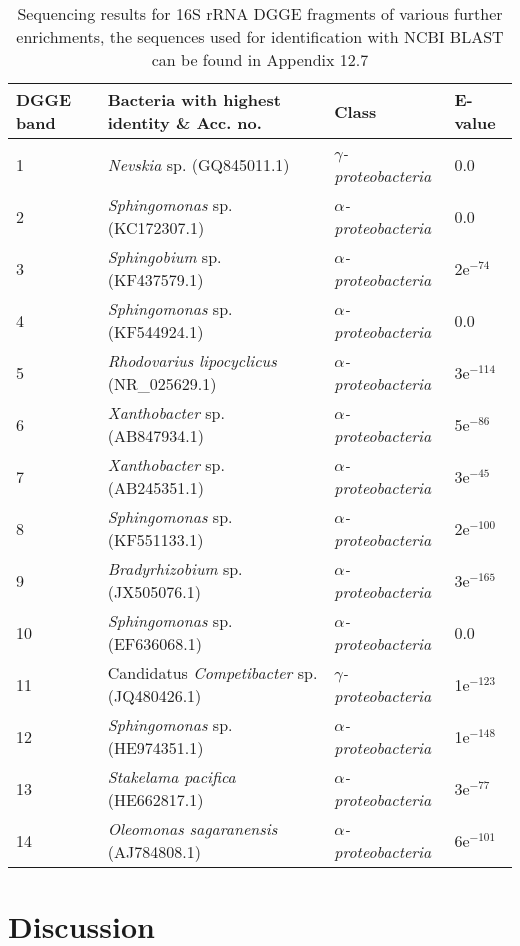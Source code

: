 \documentclass{article}
\begin{document}
\begin{table}
\begin{tabular}{ | l | p{7.8cm} | p{3cm} | l | }
\hline
DGGE band & Bacteria with highest identity \& Acc. no. & Class & E-value \\
\hline
1 & \emph{Nevskia} sp. (GQ845011.1) & \emph{$\gamma$-proteobacteria} & 0.0  \\
\hline
2 & \emph{Sphingomonas} sp. (KC172307.1) & \emph{$\alpha$-proteobacteria} & 0.0 \\
\hline
3 & \emph{Sphingobium} sp. (KF437579.1) & \emph{$\alpha$-proteobacteria} & 2e$^{-74}$ \\
\hline
4 & \emph{Sphingomonas} sp. (KF544924.1) & \emph{$\alpha$-proteobacteria} & 0.0  \\
\hline
5 & \emph{Rhodovarius lipocyclicus} (NR\_025629.1) & \emph{$\alpha$-proteobacteria} & 3e$^{-114}$ \\
\hline
6 & \emph{Xanthobacter} sp. (AB847934.1) & \emph{$\alpha$-proteobacteria} & 5e$^{-86}$  \\
\hline
7 & \emph{Xanthobacter} sp. (AB245351.1) & \emph{$\alpha$-proteobacteria} & 3e$^{-45}$  \\
\hline
8 & \emph{Sphingomonas} sp.(KF551133.1) & \emph{$\alpha$-proteobacteria} & 2e$^{-100}$  \\
\hline
9 & \emph{Bradyrhizobium} sp. (JX505076.1) & \emph{$\alpha$-proteobacteria} & 3e$^{-165}$  \\
\hline
10 & \emph{Sphingomonas} sp. (EF636068.1) & \emph{$\alpha$-proteobacteria} & 0.0  \\
\hline
11 & Candidatus \emph{Competibacter} sp. (JQ480426.1) & \emph{$\gamma$-proteobacteria} & 1e$^{-123}$  \\
\hline
12 & \emph{Sphingomonas} sp. (HE974351.1) & \emph{$\alpha$-proteobacteria} &  1e$^{-148}$ \\
\hline
13 & \emph{Stakelama pacifica} (HE662817.1) & \emph{$\alpha$-proteobacteria} & 3e$^{-77}$  \\
\hline
14 & \emph{Oleomonas sagaranensis} (AJ784808.1) & \emph{$\alpha$-proteobacteria} & 6e$^{-101}$  \\
\hline
\end{tabular}
\caption{Sequencing results for 16S rRNA DGGE fragments of various further enrichments, the sequences used for identification with NCBI BLAST can be found in Appendix 12.7}
\end{table}

\newpage
\section{Discussion}
\end{document}
